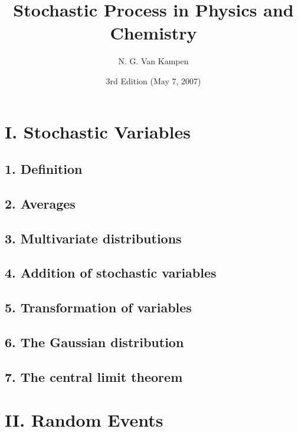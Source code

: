 \documentclass{book}
\begin{document}
\newcommand{\repl}[2]{{\color{gray} [#1] }{\color{blue} #2}}
\newcommand{\add}[1]{{\color{blue} #1}}
\newcommand{\del}[1]{{\color{gray} [#1]}}
\newcommand{\note}[1]{{\color{OliveGreen}\small [\textbf{Comment.} #1]}}

\newcommand{\hl}[1]{{\color{red} #1}}

\tableofcontents

\title{Stochastic Process in Physics and Chemistry}
\author{N. G. Van Kampen}
\date{3rd Edition (May 7, 2007)}


\chapter{I. Stochastic Variables}

\section{1. Definition}

\section{2. Averages}

\section{3. Multivariate distributions}

\section{4. Addition of stochastic variables}

\section{5. Transformation of variables}

\section{6. The Gaussian distribution}

\section{7. The central limit theorem}




\chapter{II. Random Events}
\end{document}
